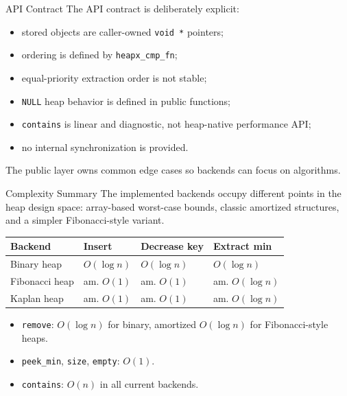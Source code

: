 \documentclass[10pt,aspectratio=43]{beamer}
\begin{document}
\begin{frame}{API Contract}
    The API contract is deliberately explicit:

    \begin{itemize}
        \item stored objects are caller-owned \texttt{void *} pointers;
        \item ordering is defined by \texttt{heapx\_cmp\_fn};
        \item equal-priority extraction order is not stable;
        \item \texttt{NULL} heap behavior is defined in public functions;
        \item \texttt{contains} is linear and diagnostic, not heap-native performance API;
        \item no internal synchronization is provided.
    \end{itemize}

    \vspace{0.5em}
    The public layer owns common edge cases so backends can focus on algorithms.
\end{frame}

\begin{frame}{Complexity Summary}
    The implemented backends occupy different points in the heap design space:
    array-based worst-case bounds, classic amortized structures, and a simpler Fibonacci-style variant.

    \vspace{0.4em}
    \begin{center}
        \begin{tabular}{llll}
            \toprule
            Backend        & Insert      & Decrease key & Extract min     \\
            \midrule
            Binary heap    & $O(\log n)$ & $O(\log n)$  & $O(\log n)$     \\
            Fibonacci heap & am. $O(1)$  & am. $O(1)$   & am. $O(\log n)$ \\
            Kaplan heap    & am. $O(1)$  & am. $O(1)$   & am. $O(\log n)$ \\
            \bottomrule
        \end{tabular}
    \end{center}

    \vspace{0.6em}
    \begin{itemize}
        \item \texttt{remove}: $O(\log n)$ for binary, amortized $O(\log n)$ for Fibonacci-style heaps.
        \item \texttt{peek\_min}, \texttt{size}, \texttt{empty}: $O(1)$.
        \item \texttt{contains}: $O(n)$ in all current backends.
    \end{itemize}
\end{frame}
\end{document}
